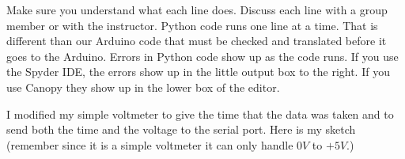 % 
% 
% 
%    
%         
%    

Make sure you understand what each line does. Discuss each line with a group
member or with the instructor. Python code runs one line at a time. That is
different than our Arduino code that must be checked and translated before
it goes to the Arduino. Errors in Python code show up as the code runs. If
you use the Spyder IDE, the errors show up in the little output box to the
right. If you use Canopy they show up in the lower box of the editor.

I modified my simple voltmeter to give the time that the data was taken and
to send both the time and the voltage to the serial port. Here is my sketch
(remember since it is a simple voltmeter it can only handle $0\unit{V}$ to $%
+5\unit{V}.$)



